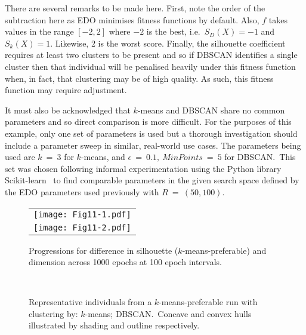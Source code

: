 There are several remarks to be made here. First, note the order of the
subtraction here as EDO minimises fitness functions by default. Also, \(f\)
takes values in the range \([-2, 2]\) where \(-2\) is the best, i.e.\ \(S_D(X) =
-1\) and \(S_k(X) = 1\). Likewise, 2 is the worst score. Finally, the silhouette
coefficient requires at least two clusters to be present and so if DBSCAN
identifies a single cluster then that individual will be penalised heavily under
this fitness function when, in fact, that clustering may be of high quality. As
such, this fitness function may require adjustment.

It must also be acknowledged that \(k\)-means and DBSCAN share no common
parameters and so direct comparison is more difficult. For the purposes of this
example, only one set of parameters is used but a thorough investigation should
include a parameter sweep in similar, real-world use cases. The parameters being
used are \(k~=~3\) for \(k\)-means, and \(\epsilon~=~0.1,\ MinPoints~=~5\) for
DBSCAN.\ This set was chosen following informal experimentation using the Python
library Scikit-learn~\cite{scikit} to find comparable parameters in the given
search space defined by the EDO parameters used previously with
\(R~=~(50,100)\).

\begin{figure}[htbp]
    \centering
    \begin{tabular}{c}
        \texttt{[image: Fig11-1.pdf]}
        \\
        \texttt{[image: Fig11-2.pdf]}
    \end{tabular}
    \caption{%
        Progressions for difference in silhouette (\(k\)-means-preferable) and
        dimension across 1000 epochs at 100 epoch intervals.
    }\label{fig:dbscan-silhouette}
\end{figure}

\begin{figure}[htbp]
    \centering
    \\
    \caption[]{%
        Representative individuals from a \(k\)-means-preferable run with
        clustering by:  \(k\)-means;
         DBSCAN.\ Concave and convex hulls illustrated
        by shading and outline respectively.
    }\label{fig:dbscan-inds}
\end{figure}

